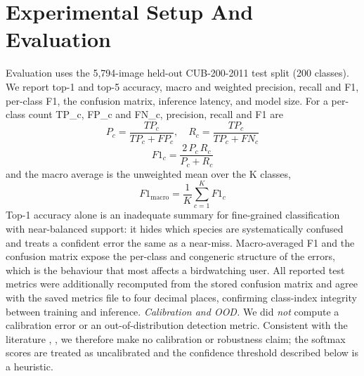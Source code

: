 \documentclass[conference]{IEEEtran}
\begin{document}
\section{Experimental Setup And Evaluation}
Evaluation uses the 5,794-image held-out CUB-200-2011 test split (200 classes). We report top-1 and top-5 accuracy, macro and weighted precision, recall and F1, per-class F1, the confusion matrix, inference latency, and model size. For a per-class count TP\_c, FP\_c and FN\_c, precision, recall and F1 are
\begin{equation}
P_c = \frac{TP_c}{TP_c + FP_c}, \quad R_c = \frac{TP_c}{TP_c + FN_c}
\end{equation}
\begin{equation}
F1_c = \frac{2\,P_c\,R_c}{P_c + R_c}
\end{equation}
and the macro average is the unweighted mean over the K classes,
\begin{equation}
F1_{\mathrm{macro}} = \frac{1}{K}\sum_{c=1}^{K} F1_c
\end{equation}
Top-1 accuracy alone is an inadequate summary for fine-grained classification with near-balanced support: it hides which species are systematically confused and treats a confident error the same as a near-miss. Macro-averaged F1 and the confusion matrix expose the per-class and congeneric structure of the errors, which is the behaviour that most affects a birdwatching user. All reported test metrics were additionally recomputed from the stored confusion matrix and agree with the saved metrics file to four decimal places, confirming class-index integrity between training and inference.
\textit{Calibration and OOD.} We did \textit{not} compute a calibration error or an out-of-distribution detection metric. Consistent with the literature \cite{ref13}, \cite{ref14}, we therefore make no calibration or robustness claim; the softmax scores are treated as uncalibrated and the confidence threshold described below is a heuristic.
\end{document}
